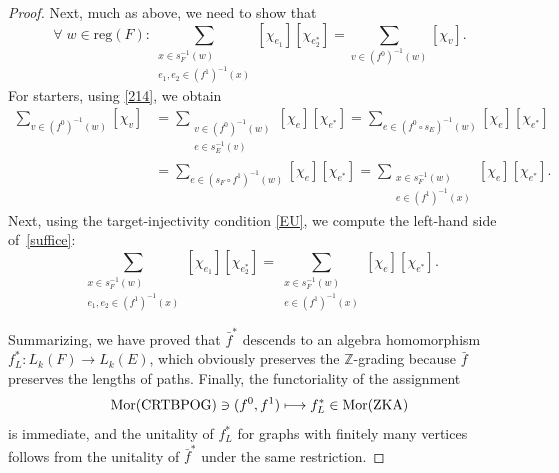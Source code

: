 \documentclass[12pt,times,a4paper]{amsart}
\numberwithin{equation}{section}
\numberwithin{equation}{section}
\begin{document}
\begin{proof}
Next, much as above, we need to show that
\begin{equation}\label{suffice}
\forall\;w\in\mathrm{reg}(F)\colon \sum_{\substack{x\in s_F^{-1}(w)\\e_1,e_2\in (f^1)^{-1}(x)}}[\chi_{e_1}][\chi_{e_2^*}]=\sum_{v\in (f^0)^{-1}(w)}[\chi_v].
\end{equation}
For starters, using \eqref{214}, we obtain
\begin{align}
\sum_{v\in (f^0)^{-1}(w)}[\chi_v]
&=\sum_{\substack{v\in (f^0)^{-1}(w)\\ e\in s_E^{-1}(v)}}[\chi_e][\chi_{e^*}]=
\sum_{e\in (f^0\circ s_E)^{-1}(w)}[\chi_e][\chi_{e^*}]
\nonumber\\ &=
\sum_{e\in (s_F\circ f^1)^{-1}(w)}[\chi_e][\chi_{e^*}]=
\sum_{\substack{x\in s_F^{-1}(w)\\ e\in (f^1)^{-1}(x)}}[\chi_e][\chi_{e^*}].
\end{align}
Next, using the target-injectivity condition \eqref{EU},  we compute the left-hand side of~\eqref{suffice}:
\begin{equation}
\sum_{\substack{x\in s_F^{-1}(w)\\ e_1,e_2\in (f^1)^{-1}(x)}}[\chi_{e_1}][\chi_{e_2^*}]=\sum_{\substack{x\in s_F^{-1}(w)\\ e\in (f^1)^{-1}(x)}}[\chi_{e}][\chi_{e^*}].
\end{equation}

Summarizing, we have proved that $\bar{f}^*$ descends to an algebra homomorphism\linebreak
 \mbox{$f^*_L\colon L_k(F)\to L_k(E)$}, which obviously preserves the $\mathbb{Z}$-grading because $\bar{f}$ preserves the lengths of paths. 
Finally, the functoriality of the assignment 
\begin{equation}
{\rm Mor}({\rm CRTBPOG})\ni (f^0,f^1)\longmapsto {f}^*_L\in {\rm Mor}(\mathrm{ZKA})
\end{equation}
 is immediate, and the unitality of ${f}^*_L$ for graphs with finitely many vertices follows from  the unitality of $\bar{f}^*$
under the same restriction.
\end{proof}
\end{document}
